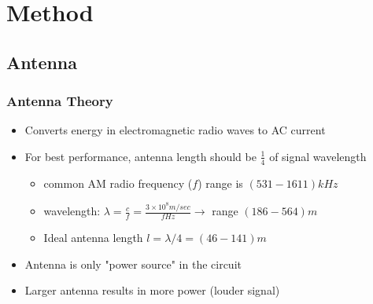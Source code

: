 \documentclass[11pt]{beamer}
\theoremstyle{definition}
\begin{document}
      \section{Method}

         \subsection{Antenna}
               \begin{frame}
                     \frametitle{Antenna Theory}
                     \begin{itemize}[<+->]
                           \item Converts energy in electromagnetic radio waves to AC current
                           \vspace{1.5mm}
                           \item For best performance, antenna length should be $\frac{1}{4}$ of signal wavelength
                           \vspace{1.5mm}
                           \begin{itemize}
                              \item common AM radio frequency ($f$) range is $(531-1611) kHz$
                              \vspace{1mm}
                              \item wavelength: $\lambda = \frac{c}{f} = \frac{3 \times 10^8 m/sec}{f Hz} \rightarrow$ range $(186-564) m$
                              \vspace{1mm}
                              \item Ideal antenna length $l = \lambda/4 = (46-141) m$
                              \vspace{1mm}
                           \end{itemize}
                           \vspace{1.5mm}
                           \item Antenna is only "power source" in the circuit
                           \vspace{1.5mm}
                           \item Larger antenna results in more power (louder signal)
                     \end{itemize}
               \end{frame}
\end{document}
